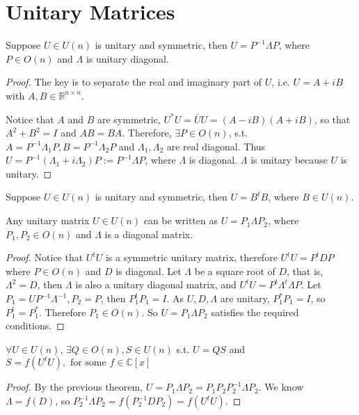 \section{Unitary Matrices}
\begin{theorem}
    Suppose $U\in U(n)$ is unitary and symmetric, then $U=P^{-1}\Lambda P$, where $P\in O(n)$ and $\Lambda$ is unitary diagonal.
\end{theorem}
\begin{proof}
    The key is to separate the real and imaginary part of $U$, i.e. $U=A+iB$ with $A,B\in \mathbb{R}^{n\times n}$.\par
    Notice that $A$ and $B$ are symmetric, $U^*U=\bar{U}U=(A-iB)(A+iB)$, so that $A^2+B^2=I$ and $AB=BA$.
Therefore, $\exists P\in O(n)$, s.t. $A=P^{-1}\Lambda_1 P,B=P^{-1}\Lambda_2 P$ and $\Lambda_1,\Lambda_2$ are real diagonal.
Thus $U=P^{-1}(\Lambda_1+i\Lambda_2)P:=P^{-1}\Lambda P$, where $\Lambda$ is diagonal. $\Lambda$ is unitary because $U$ is unitary.
\end{proof}
\begin{corollary}
    Suppose $U\in U(n)$ is unitary and symmetric, then $U=B^tB$, where $B\in U(n)$.
\end{corollary}
\begin{theorem}
    Any unitary matrix $U\in U(n)$ can be written as $U=P_{1}\Lambda P_{2}$, where $P_1,P_2\in O(n)$ and $\Lambda$ is a diagonal matrix.
\end{theorem}
\begin{proof}
    Notice that $U^tU$ is a symmetric unitary matrix, therefore $U^tU=P^tDP$ where $P\in O(n)$ and $D$ is diagonal.
Let $\Lambda$ be a square root of $D$, that is, $\Lambda^2=D$, then $\Lambda$ is also a unitary diagonal matrix, and $U^tU=P^t\Lambda^t\Lambda P$.
Let $P_1=UP^{-1}\Lambda^{-1},P_{2}=P$, then $P_1^tP_1=I$. As $U,D,\Lambda$ are unitary, $P_1^*P_1=I$, so $P_1^t=P_1^*$. Therefore $P_1\in O(n)$. So $U=P_1\Lambda P_2$ satisfies the required conditions.
\end{proof}
\begin{corollary}[QS Decomposition]
    $\forall U\in U(n)$, $\exists Q\in O(n),S\in U(n)$ s.t. $U=QS$ and $S=f(U^tU),\text{ for some } f\in \mathbb{C}[x]$
\end{corollary}
\begin{proof}
    By the previous theorem, $U=P_1\Lambda P_2=P_1P_2 P_2^{-1}\Lambda P_2$. 
We know $\Lambda =f(D)$, so $P_2^{-1}\Lambda P_2=f(P_2^{-1}DP_2)=f(U^tU)$.
\end{proof}

